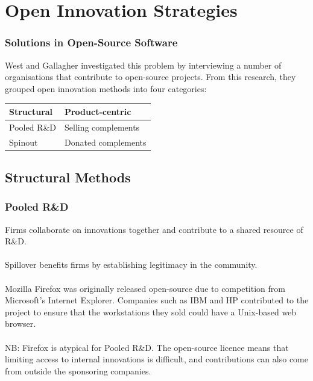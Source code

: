 \documentclass{beamer}
\begin{document}
\section{Open Innovation Strategies}

\begin{frame}
\frametitle{Solutions in Open-Source Software}
West and Gallagher investigated this problem by interviewing a number of organisations that contribute to open-source projects. From this research, they grouped open innovation methods into four categories:
\begin{table}
\begin{tabular}{l l}
\toprule
\textbf{Structural} & \textbf{Product-centric}\\
\midrule
Pooled R\&D & Selling complements \\
Spinout & Donated complements \\
\bottomrule
\end{tabular}
\end{table}
\end{frame}

\subsection{Structural Methods}

\begin{frame}
\frametitle{Pooled R\&D}
Firms collaborate on innovations together and contribute to a shared resource of R\&D.\\~\\

Spillover benefits firms by establishing legitimacy in the community.\\~\\

Mozilla Firefox was originally released open-source due to competition from Microsoft's Internet Explorer. Companies such as IBM and HP contributed to the project to ensure that the workstations they sold could have a Unix-based web browser.\\~\\

NB: Firefox is atypical for Pooled R\&D. The open-source licence means that limiting access to internal innovations is difficult, and contributions can also come from outside the sponsoring companies.
\end{frame}
\end{document}
